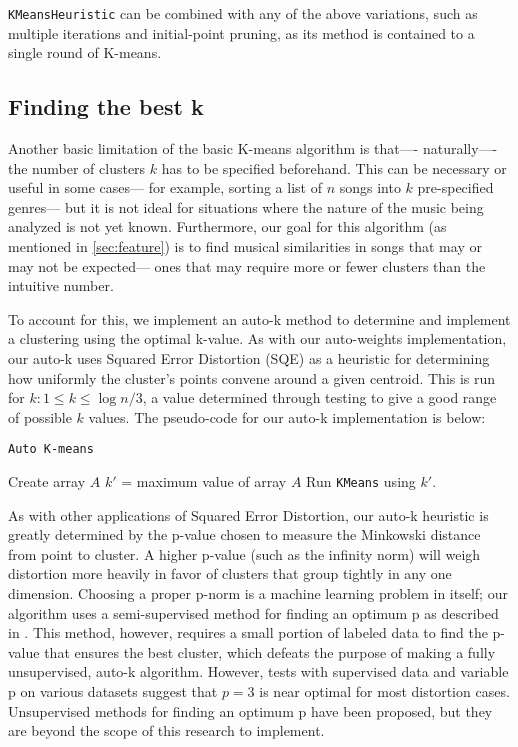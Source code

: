 \documentclass[12pt,twocolumn,titlepage]{article}
\begin{document}
\texttt{KMeansHeuristic} can be combined with any of the above variations, such as multiple iterations and initial-point pruning, as its method is contained to a single round of K-means.

\subsection{Finding the best k}

Another basic limitation of the basic K-means algorithm is that—- naturally—- the number of clusters $k$ has to be specified beforehand. This can be necessary or useful in some cases— for example, sorting a list of $n$ songs into $k$ pre-specified genres— but it is not ideal for situations where the nature of the music being analyzed is not yet known. Furthermore, our goal for this algorithm (as mentioned in \ref{sec:feature}) is to find musical similarities in songs that may or may not be expected— ones that may require more or fewer clusters than the intuitive number. 


To account for this, we implement an auto-k method to determine and implement a clustering using the optimal k-value. As with our auto-weights implementation, our auto-k uses Squared Error Distortion (SQE) as a heuristic for determining how uniformly the cluster's points convene around a given centroid. This is run for $k: 1 \leq k \leq \log{n} / 3$, a value determined through testing to give a good range of possible $k$ values. The pseudo-code for our auto-k implementation is below: 

\begin{algorithm}
 \caption{\texttt{Auto K-means}}\label{algoCPOR3}
 Create array $A$\;
 $k'$ = maximum value of array $A$\;
 Run \texttt{KMeans} using $k'$.
\end{algorithm}

As with other applications of Squared Error Distortion, our auto-k heuristic is greatly determined by the p-value chosen to measure the Minkowski distance from point to cluster. A higher p-value (such as the infinity norm) will weigh distortion more heavily in favor of clusters that group tightly in any one dimension. Choosing a proper p-norm is a machine learning problem in itself; our algorithm uses a semi-supervised method for finding an optimum p as described in \cite{SemiSupPNorm}. This method, however, requires a small portion of labeled data to find the p-value that ensures the best cluster, which defeats the purpose of making a fully unsupervised, auto-k algorithm. However, tests with supervised data and variable p on various datasets suggest that $p = 3$ is near optimal for most distortion cases. Unsupervised methods for finding an optimum p have been proposed, \cite{SemiSupPNorm} but they are beyond the scope of this research to implement. 
\end{document}
